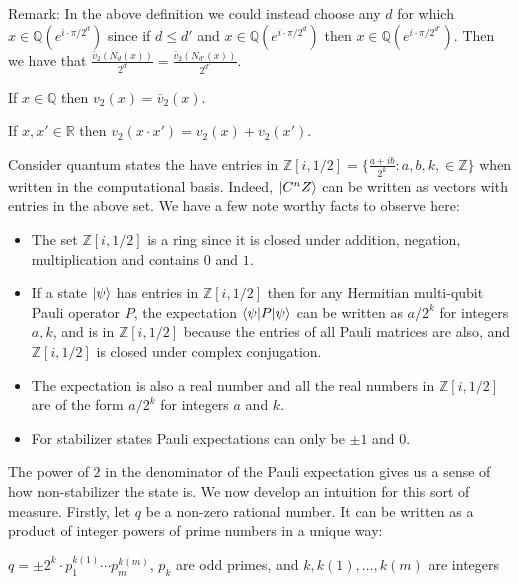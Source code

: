 \documentclass[12pt]{dalthesis}
\begin{document}
Remark: In the above definition we could instead choose any $d$ for which $x \in \mathbb{Q} (e^{i \cdot \pi / 2^d})$ since if $d \leq d'$ and $x \in \mathbb{Q} (e^{i \cdot \pi / 2^d})$ then $x \in \mathbb{Q} (e^{i \cdot \pi / 2^{d'}})$.
Then we have that $\frac{\bar{v}_2 (N_d (x))}{2^d} = \frac{\bar{v}_2 (N_{d'} (x))}{2^{d'}}$.

\begin{proposition}
If $x \in \mathbb{Q}$ then $v_2 (x) = \bar{v}_2 (x)$.
\end{proposition}

\begin{proposition}
If $x, x' \in \mathbb{R}$ then $v_2 (x \cdot x') = v_2 (x) + v_2 (x')$.
\end{proposition}


Consider quantum states the have entries in $\mathbb{Z}[i, 1/2] = \big\{\frac{a+ib}{2^k}: a, b, k, \in \mathbb{Z} \big\}$ when written in the computational basis. Indeed, $\ket{C^nZ}$ can be written as vectors with entries in the above set. We have a few note worthy facts to observe here:
\begin{itemize}
\item The set $\mathbb{Z}[i, 1/2]$ is a ring since it is closed under addition, negation, multiplication and contains $0$ and $1$.
\item If a state $\ket{\psi}$ has entries in $\mathbb{Z}[i, 1/2]$ then for any Hermitian multi-qubit Pauli operator $P$, the expectation $\braket{\psi | P | \psi}$ can be written as $a/2^k$ for integers $a, k$, and is in $\mathbb{Z}[i, 1/2]$ because the entries of all Pauli matrices are also, and $\mathbb{Z}[i, 1/2]$ is closed under complex conjugation.
\item The expectation is also a real number and all the real numbers in $\mathbb{Z}[i, 1/2]$ are of the form $a/2^k$ for integers $a$ and $k$. 
\item For stabilizer states Pauli expectations can only be $\pm 1$ and $0$.
\end{itemize}

The power of $2$ in the denominator of the Pauli expectation gives us a sense of how non-stabilizer the state is. We now develop an intuition for this sort of measure. Firstly, let $q$ be a non-zero rational number. It can be written as a product of integer powers of prime numbers in a unique way:
\begin{center}
$q = \pm 2^k \cdot p_1^{k(1)} \cdots p_m^{k(m)}$, $p_k$ are odd primes, and $k, k(1), \dots , k(m)$ are integers
\end{center}
\end{document}
